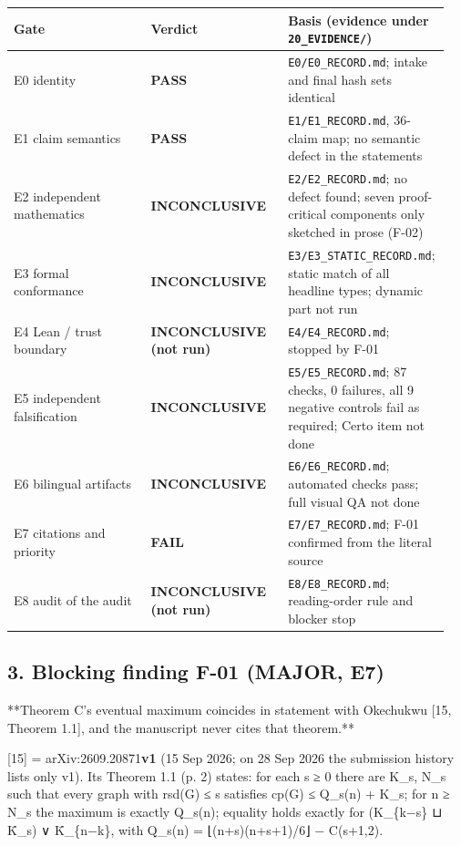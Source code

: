 \documentclass[10pt,a4paper]{article}
\begin{document}
{\small\begin{longtable}{p{0.317\linewidth}|p{0.317\linewidth}|p{0.317\linewidth}}
Gate & Verdict & Basis (evidence under \texttt{20\_EVIDENCE/}) \\ \hline
E0 identity & \textbf{PASS} & \texttt{E0/E0\_RECORD.md}; intake and final hash sets identical \\ \hline
E1 claim semantics & \textbf{PASS} & \texttt{E1/E1\_RECORD.md}, 36-claim map; no semantic defect in the statements \\ \hline
E2 independent mathematics & \textbf{INCONCLUSIVE} & \texttt{E2/E2\_RECORD.md}; no defect found; seven proof-critical components only sketched in prose (F-02) \\ \hline
E3 formal conformance & \textbf{INCONCLUSIVE} & \texttt{E3/E3\_STATIC\_RECORD.md}; static match of all headline types; dynamic part not run \\ \hline
E4 Lean / trust boundary & \textbf{INCONCLUSIVE (not run)} & \texttt{E4/E4\_RECORD.md}; stopped by F-01 \\ \hline
E5 independent falsification & \textbf{INCONCLUSIVE} & \texttt{E5/E5\_RECORD.md}; 87 checks, 0 failures, all 9 negative controls fail as required; Certo item not done \\ \hline
E6 bilingual artifacts & \textbf{INCONCLUSIVE} & \texttt{E6/E6\_RECORD.md}; automated checks pass; full visual QA not done \\ \hline
E7 citations and priority & \textbf{FAIL} & \texttt{E7/E7\_RECORD.md}; F-01 confirmed from the literal source \\ \hline
E8 audit of the audit & \textbf{INCONCLUSIVE (not run)} & \texttt{E8/E8\_RECORD.md}; reading-order rule and blocker stop \\ \hline
\end{longtable}}

\subsection*{3. Blocking finding F-01 (MAJOR, E7)}

**Theorem C's eventual maximum coincides in statement with Okechukwu [15, Theorem 1.1], and the manuscript never
cites that theorem.**

[15] = arXiv:2609.20871\textbf{v1} (15 Sep 2026; on 28 Sep 2026 the submission history lists only v1). Its
Theorem 1.1 (p. 2) states: for each s ≥ 0 there are K\_s, N\_s such that every graph with rsd(G) ≤ s satisfies
cp(G) ≤ Q\_s(n) + K\_s; for n ≥ N\_s the maximum is exactly Q\_s(n); equality holds exactly for
(K\_\{k−s\} ⊔ K̄\_s) ∨ K̄\_\{n−k\}, with Q\_s(n) = ⌊(n+s)(n+s+1)/6⌋ − C(s+1,2).
\end{document}

